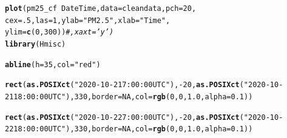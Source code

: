 \documentclass{article}\usepackage[]{graphicx}\usepackage[]{color}
\makeatletter
\newcommand{\hlnum}[1]{\textcolor[rgb]{0.686,0.059,0.569}{#1}}%
\newcommand{\hlstr}[1]{\textcolor[rgb]{0.192,0.494,0.8}{#1}}%
\newcommand{\hlcom}[1]{\textcolor[rgb]{0.678,0.584,0.686}{\textit{#1}}}%
\newcommand{\hlopt}[1]{\textcolor[rgb]{0,0,0}{#1}}%
\newcommand{\hlstd}[1]{\textcolor[rgb]{0.345,0.345,0.345}{#1}}%
\newcommand{\hlkwc}[1]{\textcolor[rgb]{0.333,0.667,0.333}{#1}}%
\newcommand{\hlkwd}[1]{\textcolor[rgb]{0.737,0.353,0.396}{\textbf{#1}}}%
\newenvironment{kframe}{%
 \def\at@end@of@kframe{}%
 \ifinner\ifhmode%
  \def\at@end@of@kframe{\end{minipage}}%
  \begin{minipage}{\columnwidth}%
 \fi\fi%
 \def\FrameCommand##1{\hskip\@totalleftmargin \hskip-\fboxsep
 \colorbox{shadecolor}{##1}\hskip-\fboxsep
     \hskip-\linewidth \hskip-\@totalleftmargin \hskip\columnwidth}%
 \MakeFramed {\advance\hsize-\width
   \@totalleftmargin\z@ \linewidth\hsize
   \@setminipage}}%
 {\par\unskip\endMakeFramed%
 \at@end@of@kframe}
\newenvironment{knitrout}{}{} %
\makeatother
\begin{document}
\begin{knitrout}
\color{fgcolor}\begin{kframe}
\begin{alltt}
\hlkwd{plot}\hlstd{(pm25_cf}\hlopt{~}\hlstd{DateTime,} \hlkwc{data}\hlstd{=cleandata,} \hlkwc{pch}\hlstd{=}\hlnum{20}\hlstd{,}
    \hlkwc{cex}\hlstd{=}\hlnum{.5}\hlstd{,} \hlkwc{las}\hlstd{=}\hlnum{1}\hlstd{,} \hlkwc{ylab}\hlstd{=}\hlstr{"PM2.5"}\hlstd{,} \hlkwc{xlab}\hlstd{=}\hlstr{"Time"}\hlstd{,}
    \hlkwc{ylim}\hlstd{=}\hlkwd{c}\hlstd{(}\hlnum{0}\hlstd{,}\hlnum{300}\hlstd{))}\hlcom{#, xaxt='y')}
\hlkwd{library}\hlstd{(Hmisc)}
\end{alltt}


{\ttfamily\noindent\itshape\color{messagecolor}{\#\# Loading required package: lattice}}

{\ttfamily\noindent\itshape\color{messagecolor}{\#\# Loading required package: survival}}

{\ttfamily\noindent\itshape\color{messagecolor}{\#\# Loading required package: Formula}}

{\ttfamily\noindent\itshape\color{messagecolor}{\#\# Loading required package: ggplot2}}

{\ttfamily\noindent\itshape\color{messagecolor}{\#\# \\\#\# Attaching package: 'Hmisc'}}

{\ttfamily\noindent\itshape\color{messagecolor}{\#\# The following objects are masked from 'package:base':\\\#\# \\\#\#\ \ \ \  format.pval, units}}\begin{alltt}
\hlkwd{abline}\hlstd{(}\hlkwc{h}\hlstd{=}\hlnum{35}\hlstd{,} \hlkwc{col}\hlstd{=}\hlstr{"red"}\hlstd{)}

\hlkwd{rect}\hlstd{(}\hlkwd{as.POSIXct}\hlstd{(}\hlstr{"2020-10-21 7:00:00 UTC"}\hlstd{),} \hlopt{-}\hlnum{20}\hlstd{,} \hlkwd{as.POSIXct}\hlstd{(}\hlstr{"2020-10-21 18:00:00 UTC"}\hlstd{),} \hlnum{330}\hlstd{,} \hlkwc{border} \hlstd{=} \hlnum{NA}\hlstd{,} \hlkwc{col}\hlstd{=} \hlkwd{rgb}\hlstd{(}\hlnum{0}\hlstd{,}\hlnum{0}\hlstd{,}\hlnum{1.0}\hlstd{,}\hlkwc{alpha}\hlstd{=}\hlnum{0.1}\hlstd{))}

\hlkwd{rect}\hlstd{(}\hlkwd{as.POSIXct}\hlstd{(}\hlstr{"2020-10-22 7:00:00 UTC"}\hlstd{),} \hlopt{-}\hlnum{20}\hlstd{,} \hlkwd{as.POSIXct}\hlstd{(}\hlstr{"2020-10-22 18:00:00 UTC"}\hlstd{),} \hlnum{330}\hlstd{,} \hlkwc{border} \hlstd{=} \hlnum{NA}\hlstd{,} \hlkwc{col}\hlstd{=} \hlkwd{rgb}\hlstd{(}\hlnum{0}\hlstd{,}\hlnum{0}\hlstd{,}\hlnum{1.0}\hlstd{,}\hlkwc{alpha}\hlstd{=}\hlnum{0.1}\hlstd{))}


\end{alltt}
\end{kframe}
\end{knitrout}
\end{document}
